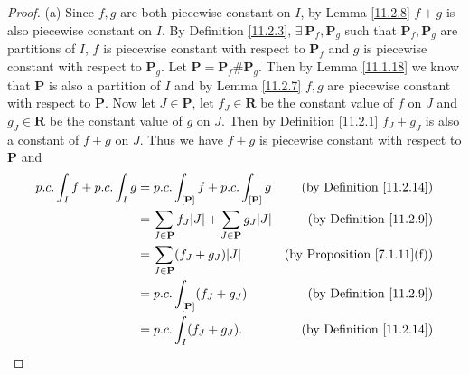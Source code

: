 \begin{proof}{(a)}
    Since \(f, g\) are both piecewise constant on \(I\), by Lemma \ref{11.2.8} \(f + g\) is also piecewise constant on \(I\).
    By Definition \ref{11.2.3}, \(\exists\ \mathbf{P}_f, \mathbf{P}_g\) such that \(\mathbf{P}_f, \mathbf{P}_g\) are partitions of \(I\), \(f\) is piecewise constant with respect to \(\mathbf{P}_f\) and \(g\) is piecewise constant with respect to \(\mathbf{P}_g\).
    Let \(\mathbf{P} = \mathbf{P}_f \# \mathbf{P}_g\).
    Then by Lemma \ref{11.1.18} we know that \(\mathbf{P}\) is also a partition of \(I\) and by Lemma \ref{11.2.7} \(f, g\) are piecewise constant with respect to \(\mathbf{P}\).
    Now let \(J \in \mathbf{P}\), let \(f_J \in \mathbf{R}\) be the constant value of \(f\) on \(J\) and \(g_J \in \mathbf{R}\) be the constant value of \(g\) on \(J\).
    Then by Definition \ref{11.2.1} \(f_J + g_J\) is also a constant of \(f + g\) on \(J\).
    Thus we have \(f + g\) is piecewise constant with respect to \(\mathbf{P}\) and
    \begin{align*}
        p.c. \int_I f + p.c. \int_I g & = p.c. \int_{[\mathbf{P}]} f + p.c. \int_{[\mathbf{P}]} g                     & \text{(by Definition \ref{11.2.14})}    \\
                                      & = \sum_{J \in \mathbf{P}} f_J \abs*{J} + \sum_{J \in \mathbf{P}} g_J \abs*{J} & \text{(by Definition \ref{11.2.9})}     \\
                                      & = \sum_{J \in \mathbf{P}} (f_J + g_J) \abs*{J}                                & \text{(by Proposition \ref{7.1.11}(f))} \\
                                      & = p.c. \int_{[\mathbf{P}]} (f_J + g_J)                                        & \text{(by Definition \ref{11.2.9})}     \\
                                      & = p.c. \int_I (f_J + g_J).                                                    & \text{(by Definition \ref{11.2.14})}
    \end{align*}
\end{proof}

